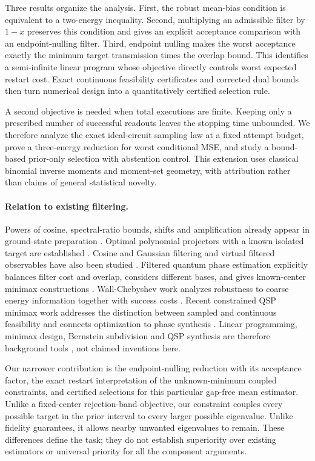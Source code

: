 \documentclass[11pt]{article}
\begin{document}
Three results organize the analysis. First, the robust mean-bias condition
is equivalent to a two-energy inequality. Second, multiplying an admissible
filter by $1-x$ preserves this condition and gives an explicit acceptance
comparison with an endpoint-nulling filter. Third, endpoint nulling makes
the worst acceptance exactly the minimum target transmission times the
overlap bound. This identifies a semi-infinite linear program whose
objective directly controls worst expected restart cost. Exact continuous
feasibility certificates and corrected dual bounds then turn numerical
design into a quantitatively certified selection rule.

A second objective is needed when total executions are finite. Keeping
only a prescribed number of successful readouts leaves the stopping time
unbounded. We therefore analyze the exact ideal-circuit sampling law at a
fixed attempt budget, prove a three-energy reduction for worst conditional
MSE, and study a bound-based prior-only selection with abstention control.
This extension uses classical binomial inverse moments and moment-set
geometry, with attribution rather than claims of general statistical novelty.

\paragraph{Relation to existing filtering.}
Powers of cosine, spectral-ratio bounds, shifts and amplification already
appear in ground-state preparation \cite{Ge}. Optimal polynomial projectors
with a known isolated target are established \cite{LinTong}.
Cosine and Gaussian filtering and virtual filtered observables have also
been studied \cite{Lu,He}. Filtered quantum phase estimation explicitly
balances filter cost and overlap, considers different bases, and gives
known-center minimax constructions \cite{FQPE}. Wall-Chebyshev work analyzes
robustness to coarse energy information together with success costs
\cite{Wall}. Recent constrained QSP minimax work addresses the distinction
between sampled and continuous feasibility and connects optimization to
phase synthesis \cite{Constrained}. Linear programming, minimax design,
Bernstein subdivision and QSP synthesis are therefore background tools
\cite{Charnes,Farouki,DongPhase}, not claimed inventions here.

Our narrower contribution is the endpoint-nulling reduction with its
acceptance factor, the exact restart interpretation of the unknown-minimum
coupled constraints, and certified selections for this particular
gap-free mean estimator. Unlike a fixed-center rejection-band objective,
our constraint couples every possible target in the prior interval to
every larger possible eigenvalue. Unlike fidelity guarantees, it allows
nearby unwanted eigenvalues to remain. These differences define the task;
they do not establish superiority over existing estimators or universal
priority for all the component arguments.
\end{document}
